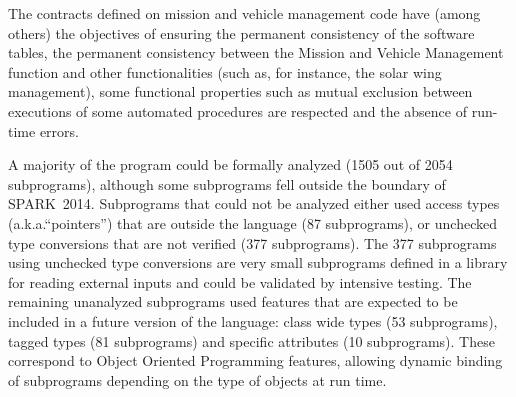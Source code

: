 \documentclass[10pt,a4paper,twocolumn]{article}
\newcommand{\newspark}{SPARK~2014\xspace}
\newcommand{\aka}{a.k.a.\xspace}
\begin{document}
The contracts defined on mission and vehicle management code have
(among others) the objectives of ensuring the permanent consistency of
the software tables, the permanent consistency between the Mission and
Vehicle Management function and other functionalities (such as, for
instance, the solar wing management), some functional properties such
as mutual exclusion between executions of some automated procedures
are respected and the absence of run-time errors.


A majority of the program could be formally analyzed (1505 out of 2054
subprograms), although some subprograms fell outside the boundary of
\newspark.  Subprograms that could not be analyzed either used access
types (\aka ``pointers'') that are outside the language (87
subprograms), or unchecked type conversions that are not verified (377
subprograms).  The 377 subprograms using unchecked type conversions
are very small subprograms defined in a library for reading external
inputs and could be validated by intensive testing. The remaining
unanalyzed subprograms used features that are expected to be included
in a future version of the language: class wide types (53
subprograms), tagged types (81 subprograms) and specific attributes
(10 subprograms). These correspond to Object Oriented Programming
features, allowing dynamic binding of subprograms depending on the
type of objects at run time.


\end{document}
